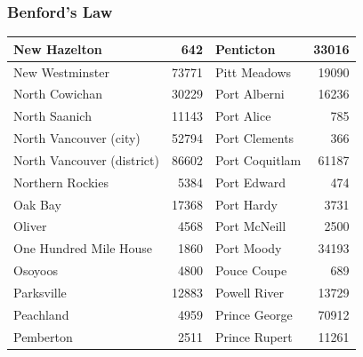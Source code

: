 \documentclass[xcolor=dvipsnames]{beamer}
\begin{document}
\begin{frame}
  \frametitle{Benford's Law}
\begin{tabular}{|l|r|l|r|}
\hline
New Hazelton               & 642   & Penticton      & 33016 \\
\hline
New Westminster            & 73771 & Pitt Meadows   & 19090 \\
\hline
North Cowichan             & 30229 & Port Alberni   & 16236 \\
\hline
North Saanich              & 11143 & Port Alice     & 785   \\
\hline
North Vancouver (city)     & 52794 & Port Clements  & 366   \\
\hline
North Vancouver (district) & 86602 & Port Coquitlam & 61187 \\
\hline
Northern Rockies           & 5384  & Port Edward    & 474   \\
\hline
Oak Bay                    & 17368 & Port Hardy     & 3731  \\
\hline
Oliver                     & 4568  & Port McNeill   & 2500  \\
\hline
One Hundred Mile House     & 1860  & Port Moody     & 34193 \\
\hline
Osoyoos                    & 4800  & Pouce Coupe    & 689   \\
\hline
Parksville                 & 12883 & Powell River   & 13729 \\
\hline
Peachland                  & 4959  & Prince George  & 70912 \\
\hline
Pemberton                  & 2511  & Prince Rupert  & 11261 \\
\hline
\end{tabular}

\end{frame}
\end{document}
